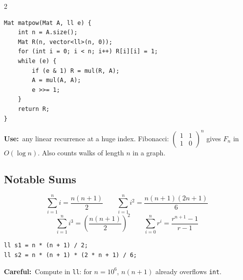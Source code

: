 \documentclass[10pt]{article}
\newcommand{\code}[1]{\texttt{\small #1}}
\newcommand{\uses}[1]{{\color{accent2}\footnotesize\textbf{Use:}}~{\footnotesize #1}\par}
\newcommand{\warn}[1]{{\color{warnc}\footnotesize\textbf{Careful:}}~{\footnotesize #1}\par}
\begin{document}
\begin{multicols}{2}
\begin{lstlisting}
Mat matpow(Mat A, ll e) {
    int n = A.size();
    Mat R(n, vector<ll>(n, 0));
    for (int i = 0; i < n; i++) R[i][i] = 1;
    while (e) {
        if (e & 1) R = mul(R, A);
        A = mul(A, A);
        e >>= 1;
    }
    return R;
}
\end{lstlisting}
\uses{any linear recurrence at a huge index. Fibonacci:
$\begin{pmatrix}1&1\\1&0\end{pmatrix}^n$ gives $F_n$ in
$O(\log n)$. Also counts walks of length $n$ in a graph.}

\subsection{Notable Sums}
\[\sum_{i=1}^{n} i = \frac{n(n+1)}{2} \qquad
  \sum_{i=1}^{n} i^2 = \frac{n(n+1)(2n+1)}{6}\]
\[\sum_{i=1}^{n} i^3 = \left(\frac{n(n+1)}{2}\right)^2 \qquad
  \sum_{i=0}^{n} r^i = \frac{r^{n+1}-1}{r-1}\]
\begin{lstlisting}
ll s1 = n * (n + 1) / 2;
ll s2 = n * (n + 1) * (2 * n + 1) / 6;
\end{lstlisting}
\warn{Compute in \code{ll}: for $n = 10^6$, $n(n+1)$ already overflows
\code{int}.}

\end{multicols}

\end{document}
